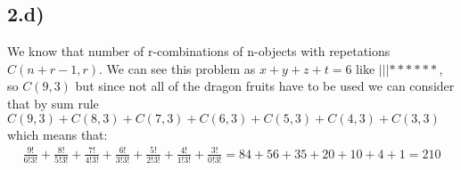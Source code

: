\documentclass[12pt]{article}
\begin{document}
\subsection*{2.d)}
We know that number of r-combinations of n-objects with repetations $C(n+r-1,r)$. We can see this problem as $x+y+z+t = 6$ like $ |||******$,  so $C(9,3)$ but since not all of the dragon fruits have to be used we can consider that by sum rule $C(9,3)+C(8,3)+C(7,3)+C(6,3)+C(5,3)+C(4,3)+C(3,3)$ which means that:
\begin{equation} 
\begin{split} 
   \frac{9!}{6!3!} + \frac{8!}{5!3!} + \frac{7!}{4!3!} +\frac{6!}{3!3!}+\frac{5!}{2!3!}+\frac{4!}{1!3!}+\frac{3!}{0!3!}= 84+56+35+20+10+4+1 = 210
\end{split}
\end{equation}
\end{document}
